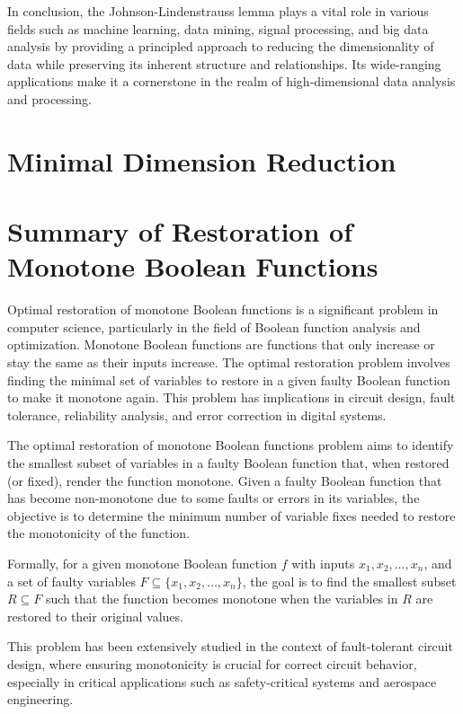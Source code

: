 \documentclass{article}
\renewcommand{\_}{\ifincsname_\else\legacyunderscore\fi}
\begin{document}
In conclusion, the Johnson-Lindenstrauss lemma plays a vital role in various fields such as machine learning, data mining, signal processing, and big data analysis by providing a principled approach to reducing the dimensionality of data while preserving its inherent structure and relationships. Its wide-ranging applications make it a cornerstone in the realm of high-dimensional data analysis and processing.


\section*{Minimal Dimension Reduction}

\section*{Summary of Restoration of Monotone Boolean Functions}
Optimal restoration of monotone Boolean functions is a significant problem in computer science, particularly in the field of Boolean function analysis and optimization. Monotone Boolean functions are functions that only increase or stay the same as their inputs increase. The optimal restoration problem involves finding the minimal set of variables to restore in a given faulty Boolean function to make it monotone again. This problem has implications in circuit design, fault tolerance, reliability analysis, and error correction in digital systems.

The optimal restoration of monotone Boolean functions problem aims to identify the smallest subset of variables in a faulty Boolean function that, when restored (or fixed), render the function monotone. Given a faulty Boolean function that has become non-monotone due to some faults or errors in its variables, the objective is to determine the minimum number of variable fixes needed to restore the monotonicity of the function.

Formally, for a given monotone Boolean function \( f \) with inputs \( x_1, x_2, \ldots, x_n \), and a set of faulty variables \( F \subseteq \{x_1, x_2, \ldots, x_n\} \), the goal is to find the smallest subset \( R \subseteq F \) such that the function becomes monotone when the variables in \( R \) are restored to their original values.

This problem has been extensively studied in the context of fault-tolerant circuit design, where ensuring monotonicity is crucial for correct circuit behavior, especially in critical applications such as safety-critical systems and aerospace engineering.
\end{document}
